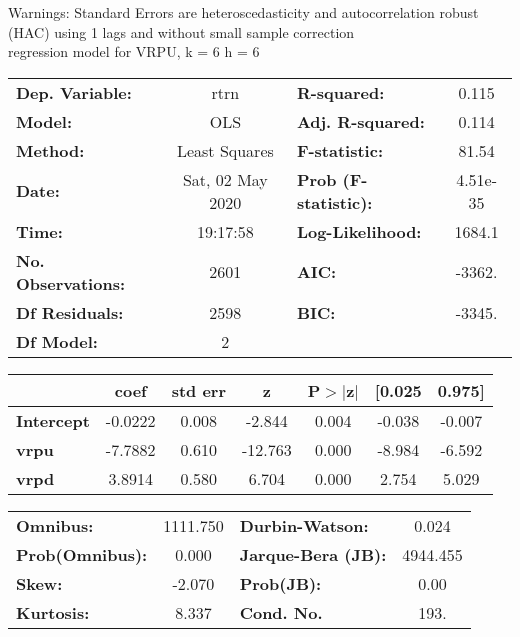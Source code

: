 Warnings: \newline
 [1] Standard Errors are heteroscedasticity and autocorrelation robust (HAC) using 1 lags and without small sample correction\\ 

regression model for VRPU, k = 6 h = 6\begin{center}
\begin{tabular}{lclc}
\toprule
\textbf{Dep. Variable:}    &       rtrn       & \textbf{  R-squared:         } &     0.115   \\
\textbf{Model:}            &       OLS        & \textbf{  Adj. R-squared:    } &     0.114   \\
\textbf{Method:}           &  Least Squares   & \textbf{  F-statistic:       } &     81.54   \\
\textbf{Date:}             & Sat, 02 May 2020 & \textbf{  Prob (F-statistic):} &  4.51e-35   \\
\textbf{Time:}             &     19:17:58     & \textbf{  Log-Likelihood:    } &    1684.1   \\
\textbf{No. Observations:} &        2601      & \textbf{  AIC:               } &    -3362.   \\
\textbf{Df Residuals:}     &        2598      & \textbf{  BIC:               } &    -3345.   \\
\textbf{Df Model:}         &           2      & \textbf{                     } &             \\
\bottomrule
\end{tabular}
\begin{tabular}{lcccccc}
                   & \textbf{coef} & \textbf{std err} & \textbf{z} & \textbf{P$> |$z$|$} & \textbf{[0.025} & \textbf{0.975]}  \\
\midrule
\textbf{Intercept} &      -0.0222  &        0.008     &    -2.844  &         0.004        &       -0.038    &       -0.007     \\
\textbf{vrpu}      &      -7.7882  &        0.610     &   -12.763  &         0.000        &       -8.984    &       -6.592     \\
\textbf{vrpd}      &       3.8914  &        0.580     &     6.704  &         0.000        &        2.754    &        5.029     \\
\bottomrule
\end{tabular}
\begin{tabular}{lclc}
\textbf{Omnibus:}       & 1111.750 & \textbf{  Durbin-Watson:     } &    0.024  \\
\textbf{Prob(Omnibus):} &   0.000  & \textbf{  Jarque-Bera (JB):  } & 4944.455  \\
\textbf{Skew:}          &  -2.070  & \textbf{  Prob(JB):          } &     0.00  \\
\textbf{Kurtosis:}      &   8.337  & \textbf{  Cond. No.          } &     193.  \\
\bottomrule
\end{tabular}
\end{center}


